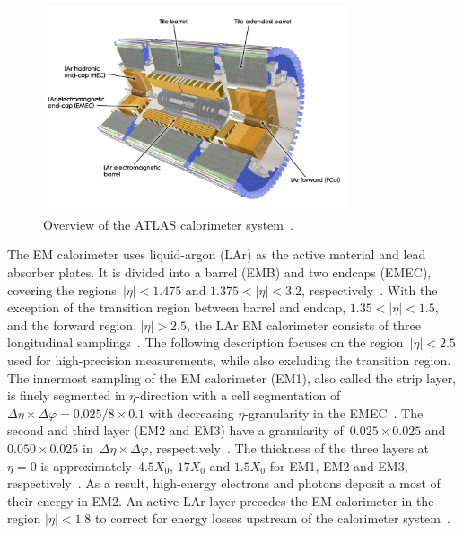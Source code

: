 \begin{figure}[htb]
  \centering
  \includegraphics[width=0.8\textwidth]{./figures/atlas/calorimeter.jpg}
  \caption[Overview of the calorimeter system]{Overview of the ATLAS calorimeter
    system~\cite{calo_fig}.}
  \label{fig:atlas_calo}
\end{figure}

The EM calorimeter uses liquid-argon (LAr) as the active material and lead
absorber plates. It is divided into a barrel (EMB) and two endcaps (EMEC),
covering the regions~$|\eta| < 1.475$ and $1.375 < |\eta| < 3.2$,
respectively~\cite{atlas_detector}. With the exception of the transition region
between barrel and endcap, $1.35 < |\eta| < 1.5$, and the forward region,
$|\eta| > 2.5$, the LAr EM calorimeter consists of three longitudinal
samplings~\cite{atlas_detector}. The following description focuses on the
region~$|\eta| < 2.5$ used for high-precision measurements, while also excluding
the transition region. The innermost sampling of the EM calorimeter (EM1), also
called the strip layer, is finely segmented in $\eta$-direction with a cell
segmentation of~$\Delta\eta \times \Delta\varphi = 0.025/8 \times 0.1$ with
decreasing $\eta$-granularity in the EMEC~\cite{atlas_detector}. The second and
third layer (EM2 and EM3) have a granularity of~$0.025 \times 0.025$
and~$0.050 \times 0.025$ in~$\Delta\eta \times \Delta\varphi$,
respectively~\cite{atlas_detector}. The thickness of the three layers
at~$\eta = 0$ is approximately~$4.5 X_0$, $17 X_0$ and $1.5 X_0$ for EM1, EM2
and EM3, respectively~\cite{atlas_detector}. As a result, high-energy electrons
and photons deposit a most of their energy in EM2. An active LAr layer precedes
the EM calorimeter in the region $|\eta| < 1.8$ to correct for energy losses
upstream of the calorimeter system~\cite{atlas_detector}.

